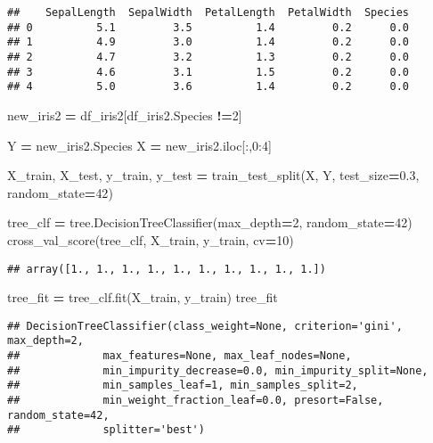 \documentclass[]{article}
\newenvironment{Shaded}{\begin{snugshade}}{\end{snugshade}}
\newcommand{\DecValTok}[1]{\textcolor[rgb]{0.00,0.00,0.81}{#1}}
\newcommand{\FloatTok}[1]{\textcolor[rgb]{0.00,0.00,0.81}{#1}}
\newcommand{\NormalTok}[1]{#1}
\newcommand{\OperatorTok}[1]{\textcolor[rgb]{0.81,0.36,0.00}{\textbf{#1}}}
\begin{document}
\begin{verbatim}
##    SepalLength  SepalWidth  PetalLength  PetalWidth  Species
## 0          5.1         3.5          1.4         0.2      0.0
## 1          4.9         3.0          1.4         0.2      0.0
## 2          4.7         3.2          1.3         0.2      0.0
## 3          4.6         3.1          1.5         0.2      0.0
## 4          5.0         3.6          1.4         0.2      0.0
\end{verbatim}

\begin{Shaded}
\begin{Highlighting}[]
\NormalTok{new_iris2 }\OperatorTok{=}\NormalTok{ df_iris2[df_iris2.Species }\OperatorTok{!=}\DecValTok{2}\NormalTok{]}

\NormalTok{Y }\OperatorTok{=}\NormalTok{ new_iris2.Species}
\NormalTok{X }\OperatorTok{=}\NormalTok{ new_iris2.iloc[:,}\DecValTok{0}\NormalTok{:}\DecValTok{4}\NormalTok{]}

\NormalTok{X_train, X_test, y_train, y_test }\OperatorTok{=}\NormalTok{ train_test_split(X, Y, test_size}\OperatorTok{=}\FloatTok{0.3}\NormalTok{, random_state}\OperatorTok{=}\DecValTok{42}\NormalTok{)}

\NormalTok{tree_clf }\OperatorTok{=}\NormalTok{ tree.DecisionTreeClassifier(max_depth}\OperatorTok{=}\DecValTok{2}\NormalTok{, random_state}\OperatorTok{=}\DecValTok{42}\NormalTok{)}
\NormalTok{cross_val_score(tree_clf, X_train, y_train, cv}\OperatorTok{=}\DecValTok{10}\NormalTok{)}
\end{Highlighting}
\end{Shaded}

\begin{verbatim}
## array([1., 1., 1., 1., 1., 1., 1., 1., 1., 1.])
\end{verbatim}

\begin{Shaded}
\begin{Highlighting}[]
\NormalTok{tree_fit }\OperatorTok{=}\NormalTok{ tree_clf.fit(X_train, y_train)}
\NormalTok{tree_fit}
\end{Highlighting}
\end{Shaded}

\begin{verbatim}
## DecisionTreeClassifier(class_weight=None, criterion='gini', max_depth=2,
##             max_features=None, max_leaf_nodes=None,
##             min_impurity_decrease=0.0, min_impurity_split=None,
##             min_samples_leaf=1, min_samples_split=2,
##             min_weight_fraction_leaf=0.0, presort=False, random_state=42,
##             splitter='best')
\end{verbatim}
\end{document}
